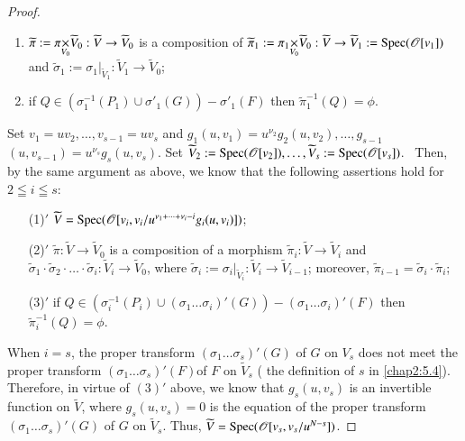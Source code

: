 \begin{proof}
\begin{enumerate}
\item
  $\widetilde{\pi}:=\fprod{\pi}{\widetilde{V}_{0}}{V_{0}}:\widetilde{V}\to
  \widetilde{V}_{0}$ is a composition of
  $\widetilde{\pi}_{1}:=\fprod{\pi_{1}}{\widetilde{V}_{0}}{V_{0}}:\widetilde{V}\to
  \widetilde{V}_{1}:=\Spec(\mathscr{O}[v_{1}])$ and
  $\widetilde{\sigma}_{1}:=\sigma_{1}|_{\widetilde{V}_{1}}:\widetilde{V}_{1}\to
  \widetilde{V}_{0}$; 

\item if $Q\in (\sigma^{-1}_{1}(P_{1})\cup
  \sigma'_{1}(G))-\sigma'_{1}(F)$ then $\widetilde{\pi}^{-1}_{1}(Q)=\phi$.
\end{enumerate}

Set $v_{1}=uv_{2},\ldots,v_{s-1}=uv_{s}$ and
$g_{1}(u,v_{1})=u^{\nu_{2}}g_{2}(u,v_{2}),\ldots,g_{s-1}$ $(u,v_{s-1})=u^{\nu_{s}}
g_{s}(u,v_{s})$. Set 
$\widetilde{V}_{2}:=\operatorname{Spec}(\mathscr{O}[v_{2}]),\ldots,
\widetilde{V}_{s}:= \operatorname{Spec}(\mathscr{O}[v_{s}])$.\pageoriginale\ \break  
Then, by the same argument as above, we know that the following
assertions hold for $2\leqq i\leqq s$:
\begin{itemize}
\item[(1)$'$]
  $\widetilde{V}=\operatorname{Spec}(\mathscr{O}[v_{i},v_{i}/u^{\nu_{1}+\cdots+\nu_{i}-i}g_{i}(u,v_{i})])$; 

\item[(2)$'$] $\widetilde{\pi}:\widetilde{V}\to \widetilde{V}_{0}$ is
  a composition of a morphism $\widetilde{\pi}_{i}:\widetilde{V}\to
  \widetilde{V}_{i}$ and $\widetilde{\sigma}_{1}\cdot
  \widetilde{\sigma}_{2}\cdot\ldots\cdot\widetilde{\sigma}_{i}:\widetilde{V}_{i}\to\widetilde{V}_{0}$,
  where
  $\widetilde{\sigma}_{i}:=\sigma_{i}|_{\widetilde{V}_{i}}:\widetilde{V}_{i}\to
  \widetilde{V}_{i-1}$; moreover,
  $\widetilde{\pi}_{i-1}=\widetilde{\sigma}_{i}\cdot
  \widetilde{\pi}_{i}$;

\item[(3)$'$] if $Q\in(\sigma^{-1}_{i}(P_{i})\cup
  (\sigma_{1}\ldots\sigma_{i})'(G))-(\sigma_{1}\ldots\sigma_{i})'(F)$
  then $\widetilde{\pi}^{-1}_{i}(Q)=\phi$. 
\end{itemize}

When $i=s$, the proper transform $(\sigma_{1}\ldots\sigma_{s})'(G)$ of
$G$ on $V_{s}$ does not meet the proper transform
$(\sigma_{1}\ldots\sigma_{s})'(F)$of $F$ on $\widetilde{V}_{s}$ (\cf
the definition of $s$ in \ref{chap2:5.4}). Therefore, in virtue of $(3)'$
above, we know that $g_{s}(u,v_{s})$ is an invertible function on
$\widetilde{V}$, where $g_{s}(u,v_{s})=0$ is the equation of the
proper transform $(\sigma_{1}\ldots\sigma_{s})'(G)$ of $G$ on
$\widetilde{V}_{s}$. Thus,
$\widetilde{V}=\operatorname{Spec}(\mathscr{O}[v_{s},v_{s}/u^{N-s}])$. 


\end{proof}
